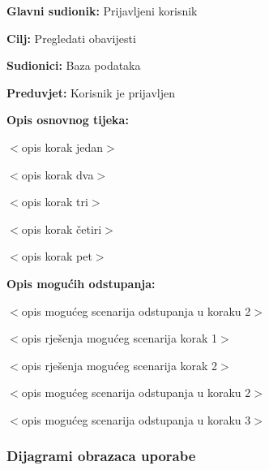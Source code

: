 \noindent {}
\begin{packed_item}

\item \textbf{Glavni sudionik:} Prijavljeni korisnik
\item  \textbf{Cilj:} Pregledati obavijesti
\item  \textbf{Sudionici:} Baza podataka
\item  \textbf{Preduvjet:} Korisnik je prijavljen
\item  \textbf{Opis osnovnog tijeka:}

\item[] \begin{packed_enum}

    \item $<$opis korak jedan$>$
    \item $<$opis korak dva$>$
    \item $<$opis korak tri$>$
    \item $<$opis korak četiri$>$
    \item $<$opis korak pet$>$

\end{packed_enum}

\item  \textbf{Opis mogućih odstupanja:}

\item[] \begin{packed_item}

    \item[2.a] $<$opis mogućeg scenarija odstupanja u koraku 2$>$
    \item[] \begin{packed_enum}

        \item $<$opis rješenja mogućeg scenarija korak 1$>$
        \item $<$opis rješenja mogućeg scenarija korak 2$>$

    \end{packed_enum}

\item[2.b] $<$opis mogućeg scenarija odstupanja u koraku 2$>$
\item[3.a] $<$opis mogućeg scenarija odstupanja  u koraku 3$>$

\end{packed_item}
\end{packed_item}

\subsubsection{Dijagrami obrazaca uporabe}

